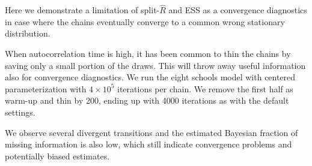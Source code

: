 \documentclass[american,]{article}
\theoremstyle{definition}
\begin{document}
Here we demonstrate a limitation of split-\(\widehat{R}\) and ESS as a
convergence diagnostics in case where the chains eventually converge
to a common wrong stationary distribution.

When autocorrelation time is high, it has been common to thin the
chains by saving only a small portion of the draws. This will throw
away useful information also for convergence diagnostics. We run the
eight schools model with centered parameterization with $4\times 10^5$
iterations per chain. We remove the first half as warm-up and thin by
200, ending up with 4000 iterations as with the default settings.

We observe several divergent transitions and the estimated Bayesian
fraction of missing information is also low, which still indicate
convergence problems and potentially biased estimates.
\end{document}
